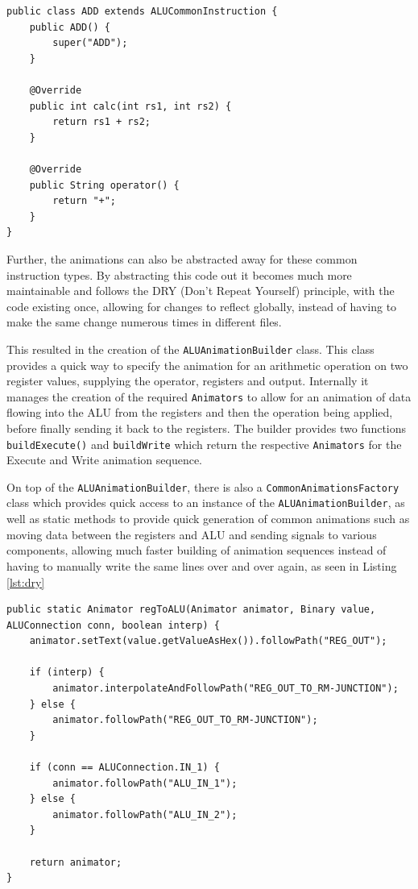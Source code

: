 \begin{lstlisting}[caption={ADD Insutrction, making useof the \texttt{ALUCommonInstruction} class}, label=lst:add_subclass]
public class ADD extends ALUCommonInstruction {
    public ADD() {
        super("ADD");
    }

    @Override
    public int calc(int rs1, int rs2) {
        return rs1 + rs2;
    }

    @Override
    public String operator() {
        return "+";
    }
}
\end{lstlisting}

Further, the animations can also be abstracted away for these common instruction types. By abstracting this code out it becomes much more maintainable and follows the DRY (Don't Repeat Yourself) principle, with the code existing once, allowing for changes to reflect globally, instead of having to make the same change numerous times in different files.

This resulted in the creation of the \texttt{ALUAnimationBuilder} class.  This class provides a quick way to specify the animation for an arithmetic operation on two register values, supplying the operator, registers and output. Internally it manages the creation of the required \texttt{Animators} to allow for an animation of data flowing into the \ac{ALU} from the registers and then the operation being applied, before finally sending it back to the registers. The builder provides two functions \verb|buildExecute()| and \verb|buildWrite| which return the respective \texttt{Animators} for the Execute and Write animation sequence. 

On top of the \texttt{ALUAnimationBuilder}, there is also a \texttt{CommonAnimationsFactory} class which provides quick access to an instance of the \texttt{ALUAnimationBuilder}, as well as static methods to provide quick generation of common animations such as moving data between the registers and \ac{ALU} and sending signals to various components, allowing much faster building of animation sequences instead of having to manually write the same lines over and over again, as seen in Listing \ref{lst:dry}

\begin{lstlisting}[caption=Factory method building a more complex animation moving data from the registers to the \ac{ALU},label=lst:dry]
public static Animator regToALU(Animator animator, Binary value, ALUConnection conn, boolean interp) {
    animator.setText(value.getValueAsHex()).followPath("REG_OUT");

    if (interp) {
        animator.interpolateAndFollowPath("REG_OUT_TO_RM-JUNCTION");
    } else {
        animator.followPath("REG_OUT_TO_RM-JUNCTION");
    }

    if (conn == ALUConnection.IN_1) {
        animator.followPath("ALU_IN_1");
    } else {
        animator.followPath("ALU_IN_2");
    }

    return animator;
}
\end{lstlisting}

